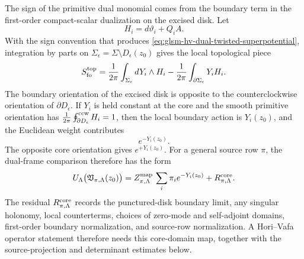 \begin{construction}
The sign of the primitive dual monomial comes from the boundary term in the
first-order compact-scalar dualization on the excised disk.  Let
\[
  H_i=d\vartheta_i+Q_iA .
\]
With the sign convention that produces
\eqref{eq:glsm-hv-dual-twisted-superpotential}, integration by parts on
\(\Sigma_\epsilon=\Sigma\setminus D_\epsilon(z_0)\) gives the local topological
piece
\[
  S_{\rm fo}^{\rm top}
  =
  \frac1{2\pi}\int_{\Sigma_\epsilon}dY_i\wedge H_i
  -
  \frac1{2\pi}\int_{\partial\Sigma_\epsilon}Y_iH_i .
\]
The boundary orientation of the excised disk is opposite to the
counterclockwise orientation of \(\partial D_\epsilon\).  If \(Y_i\) is held
constant at the core and the smooth primitive orientation has
\(\frac1{2\pi}\oint_{\partial D_\epsilon}^{\rm ccw}H_i=1\), then the local
boundary action is \(Y_i(z_0)\), and the Euclidean weight contributes
\[
  e^{-Y_i(z_0)} .
\]
The opposite core orientation gives \(e^{+Y_i(z_0)}\).  For a general source
row \(\pi\), the dual-frame comparison therefore has the form
\begin{equation}
  U_\Lambda\bigl({\mathfrak V}_{\pi,\Lambda}(z_0)\bigr)
  =
  Z^{\rm map}_{\pi,\Lambda}\,
  \sum_i\pi_i e^{-Y_i(z_0)}
  +
  R^{\rm core}_{\pi,\Lambda}.
  \label{eq:glsm-vortex-core-disorder-map}
\end{equation}
The residual \(R^{\rm core}_{\pi,\Lambda}\) records the punctured-disk
boundary limit, any singular holonomy, local counterterms, choices of
zero-mode and self-adjoint domains, first-order boundary normalization, and
source-row normalization.  A Hori--Vafa operator statement therefore needs
this core-domain map, together with the source-projection and determinant
estimates below.
\end{construction}

